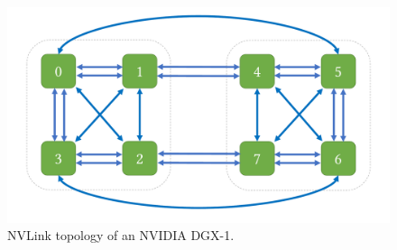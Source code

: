 



\begin{figure}[tbp]
\includegraphics[page=1,width=\columnwidth]{figures/topos.pdf}
\caption{NVLink topology of an NVIDIA DGX-1.}
\label{fig:dgx1-topo}
\end{figure}

